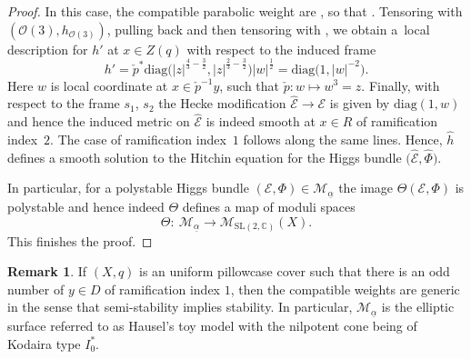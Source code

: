 \documentclass[pdftex]{sigma}
\numberwithin{equation}{section}
\theoremstyle{definition}
\newtheorem{rema}[theo]{Remark}
\renewcommand{\to}{\rightarrow}
\newcommand{\ualpha}{\underline{\alpha}}
\newcommand{\calE}{\mathcal{E}}
\newcommand{\calM}{\mathcal{M}}
\newcommand{\calO}{\mathcal{O}}
\newcommand{\CC}{\mathbb{C}}
\newcommand{\diag}{\mathrm{diag}}
\newcommand{\SL}{\mathrm{SL}}
\begin{document}
\begin{proof}
 In this case, the compatible parabolic weight are \smash{$\ualpha_y=\bigl(\frac34, \frac14\bigr)$}, so that \smash{$h=\diag\bigl( \vert z \vert^{\frac{4}{3}}, \vert z \vert^{\frac{2}{3}}\bigr)$}. Tensoring with $(\calO(3),h_{\calO(3)})$, pulling back and then tensoring with , we obtain a~local description for $h'$ at $x \in Z(q)$ with respect to the induced frame
 \[ h'= \check{p}^*\diag\bigl( \vert z \vert^{\frac{4}{3}-\frac32}, \vert z \vert^{\frac{2}{3}-\frac32}\bigr) \vert w \vert^{\frac12}= \diag\bigl( 1, \vert w \vert^{-2} \bigr).
 \]
 Here $w$ is local coordinate at $x \in \check{p}^{-1}y$, such that $\check{p}\colon w \mapsto w^3=z$. Finally, with respect to the frame $s_1$, $s_2$ the Hecke modification $\hat{\calE} \to \calE$ is given by $\diag( 1, w)$ and hence the induced metric on $\hat{\calE}$ is indeed smooth at $x \in R$ of ramification index~$2$. The case of ramification index~$1$ follows along the same lines. Hence, $\hat{h}$ defines a smooth solution to the Hitchin equation for the Higgs bundle $\bigl(\hat{\calE},\hat{\Phi}\bigr)$.

 In particular, for a polystable Higgs bundle $(\calE,\Phi) \in \calM_{\ualpha}$ the image $\Theta(\calE,\Phi)$ is polystable and hence indeed $\Theta$ defines a map of moduli spaces
 \[ \Theta\colon \ \calM_{\ualpha} \to \calM_{\SL(2,\CC)}(X).
 \]
 This finishes the proof.
\end{proof}

\begin{rema} If $(X,q)$ is an uniform pillowcase cover such that there is an odd number of $y \in D$ of ramification index $1$, then the compatible weights are generic in the sense that semi-stability implies stability. In particular, $\calM_{\ualpha}$ is the elliptic surface referred to as Hausel's toy model with the nilpotent cone being of Kodaira type $I_0^*$.
\end{rema}
\end{document}
